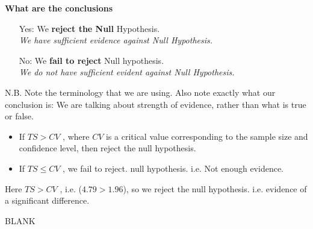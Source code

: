 \documentclass[a4paper,12pt]{article}
\begin{document}
\begin{framed}
\noindent \textbf{What are the conclusions}
	\begin{itemize} 
		
		\item[Yes:] We \textbf{reject the Null} Hypothesis. \\ \textit{We have sufficient evidence against Null Hypothesis.}
		
		\item[No:] We \textbf{fail to reject} Null hypothesis. \\ \textit{We do not have sufficient evident against Null Hypothesis.}
	\end{itemize}	
	{	\normalsize
		N.B. Note the terminology that we are using. Also note exactly what our conclusion is: We are talking about strength of evidence, rather than what is true or false.}
	
\end{framed}
\smallskip
\begin{framed}
\begin{itemize}
	\item 	If $TS > CV$ , where $CV$ is a critical value corresponding to the sample size and confidence level, then reject the null hypothesis. 
	\item  If $TS \leq CV$ , we fail to reject. null hypothesis. i.e. Not enough evidence. 
	\end{itemize}	
\end{framed}	
	\smallskip
\noindent Here $TS > CV$ , i.e. ($4.79 > 1.96$), so we reject the null hypothesis. i.e. evidence of a significant difference. 	
	
\newpage
BLANK
		
\end{document}

